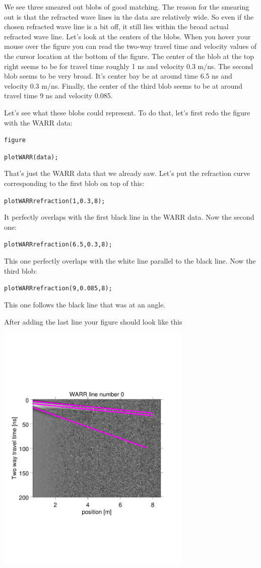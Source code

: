 \documentclass[11pt]{article}
\begin{document}
We see three smeared out blobs of good matching. The reason for the
smearing out is that the refracted wave lines in the data are
relatively wide. So even if the chosen refracted wave line is a bit
off, it still lies within the broad actual refracted wave line. Let's
look at the centers of the blobs. When you hover your mouse over the
figure you can read the two-way travel time and velocity values of the
cursor location at the bottom of the figure. The center of the blob at
the top right seems to be for travel time roughly 1 ns and velocity
0.3 m/ns. The second blob seems to be very broad. It's center bay be
at around time 6.5 ns and velocity 0.3 m/ns. Finally, the center of
the third blob seems to be at around travel time 9 ns and velocity
0.085.
 
Let's see what these blobs could represent. To do that, let's first
redo the figure with the WARR data:

\qquad \verb#figure#

\qquad \verb#plotWARR(data);#

That's just the WARR data that we already saw. Let's put the
refraction curve corresponding to the first blob on top of this:
 
\qquad \verb#plotWARRrefraction(1,0.3,8);#

It perfectly overlaps with the first black line in the WARR
data. Now the second one:

\qquad \verb#plotWARRrefraction(6.5,0.3,8);#

This one perfectly overlaps with the white line parallel to the black
line. Now the third blob:

\qquad \verb#plotWARRrefraction(9,0.085,8);#

This one follows the black line that was at an angle.

After adding the last line your figure should look like this
\begin{center}
  \includegraphics[width=0.7\textwidth,trim = 0.9cm 6cm 2cm
    6.5cm,clip]{figures/WARRlines}
\end{center}
\end{document}
